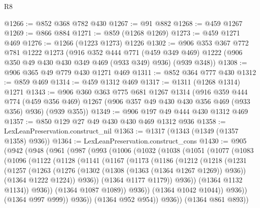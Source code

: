\begin{lexlean}{R8}
\begin{coremodule}
{{{{{{{{{{{{{{{{{@1266 := @852 @368 @782 @430
@1267 := @91 @882
@1268 := @459 @1267
@1269 := @866 @884
@1271 := @859 (@1268 @1269)
@1273 := @459 @1271 @469
@1276 := @1266 (@1223 @1273) @1226
@1302 := @906
    @353
    @367
    @772
    @781
    @1222
    @1273
    (@916
      @352
      @444
      @771
      (@459 @349 @469)
      @1222
      (@906 @350 @49 @430 @430 @349 @469 (@933 @349) @936)
      (@939 @348))
@1308 := @906 @365 @49 @779 @430 @1271 @469
@1311 := @852 @364 @777 @430
@1312 := @859 @469
@1314 := @459 @1312 @469
@1317 := @1311 (@1268 @1314) @1271
@1343 := @906
    @360
    @363
    @775
    @681
    @1267
    @1314
    (@916
      @359
      @444
      @774
      (@459 @356 @469)
      @1267
      (@906 @357 @49 @430 @430 @356 @469 (@933 @356) @936)
      (@939 @355))
@1349 := @906 @197 @49 @444 @430 @1312 @469
@1357 := @850 @129 @27 @49 @430 @430 @469 @1312 @936
@1358 := LexLeanPreservation.construct_nil
@1363 := @1317 (@1343 (@1349 (@1357 @1358) @936))
@1364 := LexLeanPreservation.construct_cons
@1430 := @905
    (@942
      (@948
        (@961
          (@987
            (@993
              (@1006
                (@1032
                  (@1038
                    (@1051
                      (@1077
                        (@1083
                          (@1096
                            (@1122
                              (@1128
                                (@1141
                                  (@1167
                                    (@1173
                                      (@1186
                                        (@1212
                                          (@1218
                                            (@1231
                                              (@1257
                                                (@1263
                                                  (@1276
                                                    (@1302 (@1308 (@1363 (@1364 @1267 @1269)) @936))
                                                    (@1364 @1222 @1224))
                                                  @936))
                                              (@1364 @1177 @1179))
                                            @936))
                                        (@1364 @1132 @1134))
                                      @936))
                                  (@1364 @1087 @1089))
                                @936))
                            (@1364 @1042 @1044))
                          @936))
                      (@1364 @997 @999))
                    @936))
                (@1364 @952 @954))
              @936))
          (@1364 @861 @893))
}}}}}}}}}}}}}}}}}
\end{coremodule}
\end{lexlean}
